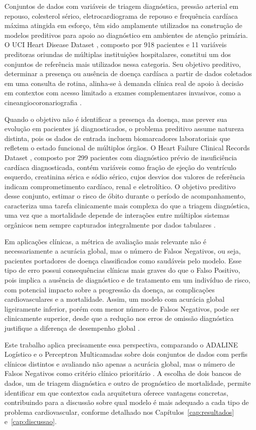 Conjuntos de dados com variáveis de triagem diagnóstica, pressão arterial em repouso, colesterol sérico, eletrocardiograma de repouso e frequência cardíaca máxima atingida em esforço, têm sido amplamente utilizados na construção de modelos preditivos para apoio ao diagnóstico em ambientes de atenção primária. O UCI Heart Disease Dataset \cite{fedesoriano2021}, composto por 918 pacientes e 11 variáveis preditoras oriundas de múltiplas instituições hospitalares, constitui um dos conjuntos de referência mais utilizados nessa categoria. Seu objetivo preditivo, determinar a presença ou ausência de doença cardíaca a partir de dados coletados em uma consulta de rotina, alinha-se à demanda clínica real de apoio à decisão em contextos com acesso limitado a exames complementares invasivos, como a cineangiocoronariografia \cite{fedesoriano2021}.

Quando o objetivo não é identificar a presença da doença, mas prever sua evolução em pacientes já diagnosticados, o problema preditivo assume natureza distinta, pois os dados de entrada incluem biomarcadores laboratoriais que refletem o estado funcional de múltiplos órgãos. O Heart Failure Clinical Records Dataset \cite{chicco2020}, composto por 299 pacientes com diagnóstico prévio de insuficiência cardíaca diagnosticada, contém variáveis como fração de ejeção do ventrículo esquerdo, creatinina sérica e sódio sérico, cujos desvios dos valores de referência indicam comprometimento cardíaco, renal e eletrolítico. O objetivo preditivo desse conjunto, estimar o risco de óbito durante o período de acompanhamento, caracteriza uma tarefa clinicamente mais complexa do que a triagem diagnóstica, uma vez que a mortalidade depende de interações entre múltiplos sistemas orgânicos nem sempre capturados integralmente por dados tabulares \cite{chicco2020}.

Em aplicações clínicas, a métrica de avaliação mais relevante não é necessariamente a acurácia global, mas o número de Falsos Negativos, ou seja, pacientes portadores de doença classificados como saudáveis pelo modelo. Esse tipo de erro possui consequências clínicas mais graves do que o Falso Positivo, pois implica a ausência de diagnóstico e de tratamento em um indivíduo de risco, com potencial impacto sobre a progressão da doença, as complicações cardiovasculares e a mortalidade. Assim, um modelo com acurácia global ligeiramente inferior, porém com menor número de Falsos Negativos, pode ser clinicamente superior, desde que a redução nos erros de omissão diagnóstica justifique a diferença de desempenho global \cite{braga2007}.

Este trabalho aplica precisamente essa perspectiva, comparando o ADALINE Logístico e o Perceptron Multicamadas sobre dois conjuntos de dados com perfis clínicos distintos e avaliando não apenas a acurácia global, mas o número de Falsos Negativos como critério clínico prioritário \cite{silva2016,mesquita2020}. A escolha de dois bancos de dados, um de triagem diagnóstica e outro de prognóstico de mortalidade, permite identificar em que contextos cada arquitetura oferece vantagens concretas, contribuindo para a discussão sobre qual modelo é mais adequado a cada tipo de problema cardiovascular, conforme detalhado nos Capítulos~\ref{cap:resultados} e~\ref{cap:discussao}.
